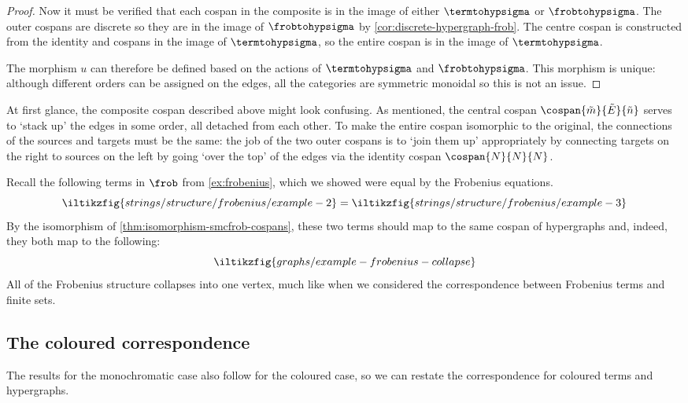 \begin{proof}
    Now it must be verified that each cospan in the composite is in the image
    of either \(\termtohypsigma\) or \(\frobtohypsigma\).
    The outer cospans are discrete so they are in the image of
    \(\frobtohypsigma\) by \cref{cor:discrete-hypergraph-frob}.
    The centre cospan is constructed from the identity and cospans in the image
    of \(\termtohypsigma\), so the entire cospan is in the
    image of \(\termtohypsigma\).

    The morphism \(u\) can therefore be defined based on the actions of
    \(\termtohypsigma\) and \(\frobtohypsigma\).
    This morphism is unique: although different orders can be assigned on the
    edges, all the categories are symmetric monoidal so this is not an issue.
\end{proof}

At first glance, the composite cospan described above might look confusing.
As mentioned, the central cospan \(\cospan{\tilde{m}}{\tilde{E}}{\tilde{n}}\)
serves to `stack up' the edges in some order, all detached from each other.
To make the entire cospan isomorphic to the original, the connections of the
sources and targets must be the same: the job of the two outer cospans is to
`join them up' appropriately by connecting targets on the right to sources on
the left by going `over the top' of the edges via the identity cospan
\(\cospan{N}{N}{N}\).

\begin{example}
    Recall the following terms in \(\frob\) from \cref{ex:frobenius}, which
    we showed were equal by the Frobenius equations.
    \[
        \iltikzfig{strings/structure/frobenius/example-2}
        =
        \iltikzfig{strings/structure/frobenius/example-3}
    \]
    By the isomorphism of \cref{thm:isomorphism-smcfrob-cospans}, these two
    terms should map to the same cospan of hypergraphs and, indeed, they both
    map to the following:
    \[
        \iltikzfig{graphs/example-frobenius-collapse}
    \]
    All of the Frobenius structure collapses into one vertex, much like when we
    considered the correspondence between Frobenius terms and finite sets.
\end{example}

\subsection{The coloured correspondence}

The results for the monochromatic case also follow for the coloured case, so we
can restate the correspondence for coloured terms and hypergraphs.

